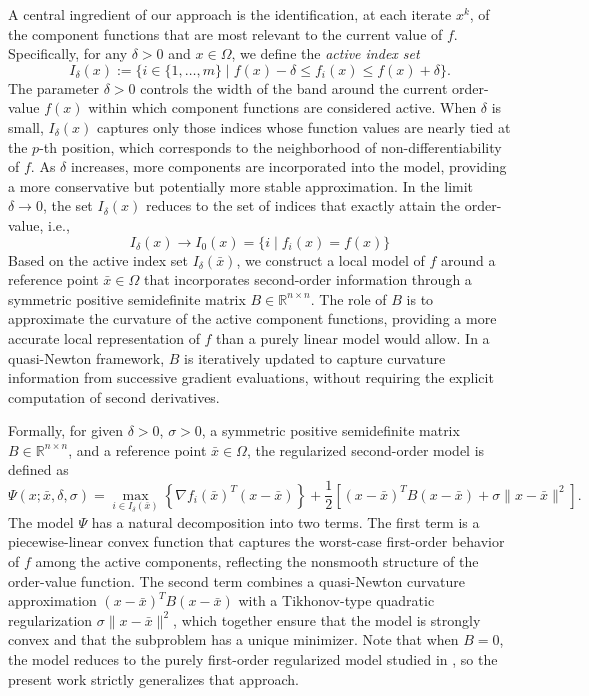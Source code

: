 \documentclass[11pt]{article}
\begin{document}
A central ingredient of our approach is the identification, at each 
iterate $x^k$, of the component functions that are most relevant to 
the current value of $f$. Specifically, for any $\delta > 0$ and 
$x \in \Omega$, we define the \textit{active index set}
\begin{equation}
    I_\delta(x) := \{i \in \{1, \ldots, m\} \mid 
    f(x) - \delta \leq f_i(x) \leq f(x) + \delta\}. \label{idelta}
\end{equation}
The parameter $\delta > 0$ controls the width of the band around the 
current order-value $f(x)$ within which component functions are 
considered active. When $\delta$ is small, $I_\delta(x)$ captures only 
those indices whose function values are nearly tied at the $p$-th 
position, which corresponds to the neighborhood of non-differentiability 
of $f$. As $\delta$ increases, more components are incorporated into 
the model, providing a more conservative but potentially more stable 
approximation. In the limit $\delta \to 0$, the set $I_\delta(x)$ 
reduces to the set of indices that exactly attain the order-value, 
i.e.,
\[
I_\delta(x) \to I_0(x) = \{i \mid f_i(x) = f(x)\}
\]
Based on the active index set $I_\delta(\bar{x})$, we construct a 
local model of $f$ around a reference point $\bar{x} \in \Omega$ that 
incorporates second-order information through a symmetric positive 
semidefinite matrix $B \in \mathbb{R}^{n \times n}$. The role of $B$ 
is to approximate the curvature of the active component functions, 
providing a more accurate local representation of $f$ than a purely 
linear model would allow. In a quasi-Newton framework, $B$ is 
iteratively updated to capture curvature information from successive 
gradient evaluations, without requiring the explicit computation of 
second derivatives.

Formally, for given $\delta > 0$, $\sigma > 0$, a symmetric positive 
semidefinite matrix $B \in \mathbb{R}^{n \times n}$, and a reference 
point $\bar{x} \in \Omega$, the regularized second-order model is 
defined as
\begin{equation}
    \Psi(x; \bar{x}, \delta, \sigma) = 
    \max_{i \in I_\delta(\bar{x})} 
    \left\{ \nabla f_i(\bar{x})^T(x - \bar{x}) \right\} 
    + \frac{1}{2} \left[ (x - \bar{x})^T B (x - \bar{x}) 
    + \sigma \|x - \bar{x}\|^2 \right]. \label{model}
\end{equation}
The model $\Psi$ has a natural decomposition into two terms. The first 
term is a piecewise-linear convex function that captures the worst-case 
first-order behavior of $f$ among the active components, reflecting the 
nonsmooth structure of the order-value function. The second term 
combines a quasi-Newton curvature approximation $(x-\bar{x})^T B 
(x-\bar{x})$ with a Tikhonov-type quadratic regularization 
$\sigma\|x - \bar{x}\|^2$, which together ensure that the model is 
strongly convex and that the subproblem has a unique minimizer. Note 
that when $B = 0$, the model reduces to the purely first-order 
regularized model studied in \cite{AlvarezBirgin2025}, so the present 
work strictly generalizes that approach.
\end{document}
